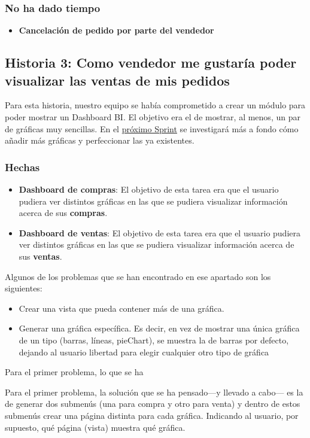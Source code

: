 \documentclass[12pt, a4paper, twoside]{article} %
\newcommand{\B}[1]{\textbf{#1}}
\newcommand{\ul}{\underline}
\begin{document}
\subsubsection{No ha dado tiempo}

\begin{itemize}
    \item  \B{Cancelación de pedido por parte del vendedor}
\end{itemize}

\subsection{Historia 3: Como vendedor me gustaría poder visualizar las ventas de mis pedidos}
Para esta historia, nuestro equipo se había comprometido a crear un módulo para poder mostrar un Dashboard BI. El objetivo era el de mostrar, al menos, un par de gráficas muy sencillas. En el \ul{próximo Sprint} se investigará más a fondo cómo añadir más gráficas y perfeccionar las ya existentes.

\subsubsection{Hechas}
\begin{itemize}
    \item \B{Dashboard de compras}: El objetivo de esta tarea era que el usuario pudiera ver distintos gráficas en las que se pudiera visualizar información acerca de sus \B{compras}.
    \item \B{Dashboard de ventas}: El objetivo de esta tarea era que el usuario pudiera ver distintos gráficas en las que se pudiera visualizar información acerca de sus \B{ventas}.
\end{itemize}

Algunos de los problemas que se han encontrado en ese apartado son los siguientes:
\begin{itemize}
    \item Crear una vista que pueda contener más de una gráfica.
    \item Generar una gráfica específica. Es decir, en vez de mostrar una única gráfica de un tipo (barras, líneas, pieChart), se muestra la de barras por defecto, dejando al usuario libertad para elegir cualquier otro tipo de gráfica
\end{itemize}
Para el primer problema, lo que se ha 

Para el primer problema, la solución que se ha pensado---y llevado a cabo--- es la de generar dos submenús (una para compra y otro para venta) y dentro de estos submenús crear una página distinta para cada gráfica. Indicando al usuario, por supuesto, qué página (vista) muestra qué gráfica.
\end{document}
